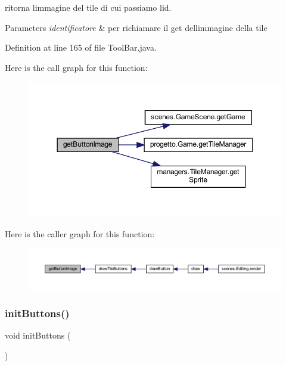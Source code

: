 ritorna l\textquotesingle{}immagine del tile di cui passiamo l\textquotesingle{}id. 


\begin{DoxyParams}{Parameters}
{\em identificatore} & per richiamare il get dell\textquotesingle{}immagine della tile \\
\hline
\end{DoxyParams}


Definition at line 165 of file Tool\+Bar.\+java.

Here is the call graph for this function\+:\nopagebreak
\begin{figure}[H]
\begin{center}
\leavevmode
\includegraphics[width=350pt]{classui_1_1_tool_bar_abe2e2af5c0d57248464e8b607c41a36f_cgraph}
\end{center}
\end{figure}
Here is the caller graph for this function\+:\nopagebreak
\begin{figure}[H]
\begin{center}
\leavevmode
\includegraphics[width=350pt]{classui_1_1_tool_bar_abe2e2af5c0d57248464e8b607c41a36f_icgraph}
\end{center}
\end{figure}
\mbox{\label{classui_1_1_tool_bar_a27d3ba5afb772cc36c9a432c28975ace}} 
\subsubsection{\texorpdfstring{init\+Buttons()}{initButtons()}}
{\footnotesize\ttfamily void init\+Buttons (\begin{DoxyParamCaption}{ }\end{DoxyParamCaption})\hspace{0.3cm}{\ttfamily [private]}}



